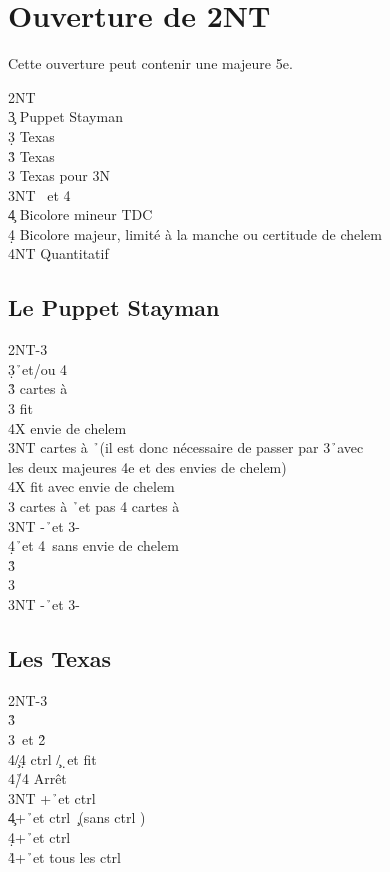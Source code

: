 \documentclass[a4paper]{article}
\begin{document}
\section{Ouverture de 2NT}

Cette ouverture peut contenir une majeure 5e.

\begin{bidtable}
2NT\\
3\c \> Puppet Stayman\\
3\d \> Texas \h \\
3\h \> Texas \s \\
3\s \> Texas pour 3N\\
3NT \s\ et 4\h \\
4\c \> Bicolore mineur TDC\\
4\d \> Bicolore majeur, limité à la manche ou certitude de chelem\\
4NT \> Quantitatif
\end{bidtable}

\subsection{Le Puppet Stayman}

\begin{bidtable}
2NT-3\c\\
3\d {}\h\ et/ou 4\s \+\\
3\h {} cartes à \s \+\\
3\s \> fit \s \+\\
4X \> envie de chelem\-\\
3NT  cartes à \h\ (il est donc nécessaire de passer par 3\h\ avec\\
\>les deux majeures 4e et des envies de chelem)\\
\>4X fit avec envie de chelem\-\\
3\s {} cartes à \h\ et pas 4 cartes à \s \\
3NT -\h\ et 3-\s \\
4\d {}\h\ et 4\s\ sans envie de chelem\-\\
3\h {}\h \\
3\s {}\s \\
3NT -\h\ et 3-\s 
\end{bidtable}

\subsection{Les Texas}

\begin{bidtable}
2NT-3\d\\
3\h {}\h \\
3\s {}\s\ et 2\h \+\\
4\c/4\d \> ctrl \c /\d\ et fit \s \\
4\h/4\s \> Arrêt\-\\
3NT +\h\ et ctrl \s \\
4\c {}+\h\ et ctrl \c\ (sans ctrl \s )\\
4\d {}+\h\ et ctrl \d \\
4\h {}+\h\ et tous les ctrl
\end{bidtable}
\end{document}

